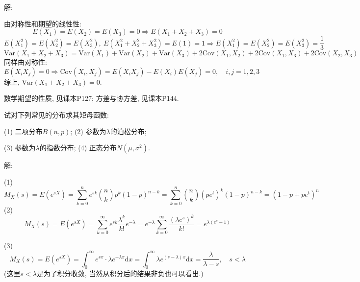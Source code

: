 \documentclass[standard]{ExBook}
\begin{document}
\begin{qitems}
    \begin{bbox}
解: 

由对称性和期望的线性性:
$$E(X_1)=E(X_2)=E(X_3)=0 \Longrightarrow E(X_1+X_2+X_3)=0$$
$$E(X_1^2)=E(X_2^2)=E(X_3^2),\ E(X_1^2+X_2^2+X_3^2)=E(1)=1 \Longrightarrow E(X_1^2)=E(X_2^2)=E(X_3^2)=\frac{1}{3}$$
$$\mathrm{Var}(X_1+X_2+X_3)=\mathrm{Var}(X_1)+\mathrm{Var}(X_2)+\mathrm{Var}(X_3)+2\mathrm{Cov}(X_1,X_2)+2\mathrm{Cov}(X_1,X_3)+2\mathrm{Cov}(X_2,X_3)$$
同样由对称性:
$$E(X_i X_j)=0 \Longrightarrow \mathrm{Cov}(X_i,X_j)=E(X_i X_j)-E(X_i)E(X_j)=0,\quad i,j=1,2,3$$
综上, $\mathrm{Var}(X_1+X_2+X_3)=0$.

\textcolor{themeColor}{\selectfont {} 数学期望的性质, 见课本P127; 方差与协方差, 见课本P144.}
    \end{bbox}

\vspace{-5em}

    \begin{bbox}
    \begin{shaded}
        \qitem
试对下列常见的分布求其矩母函数:

(1) 二项分布$B(n,p)$; (2) 参数为$\lambda$的泊松分布;

(3) 参数为$\lambda$的指数分布; (4) 正态分布$N(\mu,\sigma^2)$.
    \end{shaded}
    \end{bbox}

\vspace{-5em}

    \begin{bbox}
解: 

(1)
$$\displaystyle M_{X}(s)=E(e^{sX})=\sum\limits_{k=0}^{n}e^{sk}\binom{n}{k}p^{k}(1-p)^{n-k}=\sum\limits_{k=0}^{n}\binom{n}{k}\left(p e^{t}\right)^{k}(1-p)^{n-k}=\left(1-p+p e^{t}\right)^{n}$$
(2)
$$\displaystyle M_{X}(s)=E(e^{sX})=\sum\limits_{k=0}^{\infty}e^{sk}\frac{\lambda^k}{k!}e^{-\lambda}=e^{-\lambda}\sum\limits_{k=0}^{\infty}\frac{\left(\lambda e^{s}\right)^{k}}{k!}=e^{\lambda\left(e^s-1\right)}$$
    \end{bbox}

\vspace{-5em}

    \begin{bbox}
(3)
$$\displaystyle M_{X}(s)=E(e^{sX})=\int_{0}^{\infty}e^{sx}\cdot \lambda e^{-\lambda x}\mathrm{d}x=\int_{0}^{\infty}\lambda e^{(s-\lambda)x}\mathrm{d}x=\frac{\lambda}{\lambda-s},\quad s<\lambda$$
(这里$s<\lambda$是为了积分收敛, 当然从积分后的结果非负也可以看出.)


\end{bbox}
\end{qitems}
\end{document}
